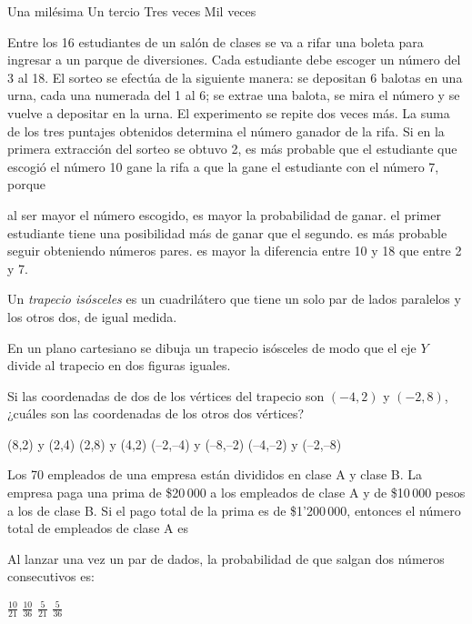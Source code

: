 \documentclass[10pt,addpoints]{exam}
\begin{document}
\begin{questions}
\begin{oneparchoices}
 \choice Una milésima
 \choice Un tercio
 \choice Tres veces
 \CorrectChoice Mil veces
\end{oneparchoices}
\question Entre los 16 estudiantes de un salón de clases se va a rifar una boleta para ingresar a un parque de diversiones. Cada estudiante debe escoger un número del 3 al 18. El sorteo se efectúa de la siguiente manera: se depositan 6 balotas en una urna, cada una numerada del 1 al 6; se extrae una balota, se mira el número y se vuelve a depositar en la urna. El experimento se repite dos veces más. La suma de los tres puntajes obtenidos determina el número ganador de la rifa. Si en la primera extracción del sorteo se obtuvo 2, es más probable que el estudiante que escogió el número 10 gane la rifa a que la gane el estudiante con el número 7, porque
\begin{choices}
 \choice al ser mayor  el número escogido, es mayor la probabilidad de ganar.
 \choice el primer estudiante tiene una posibilidad más de ganar que el segundo.
 \choice es más probable seguir obteniendo números pares.
 \CorrectChoice es mayor la diferencia entre 10 y 18 que entre 2 y 7.
\end{choices}
\question Un \emph{trapecio isósceles} es un cuadrilátero que tiene un solo par de lados paralelos y los otros dos, de igual medida.

En un plano cartesiano se dibuja un trapecio isósceles de modo que el eje $Y$ divide al trapecio en dos figuras iguales.

Si las coordenadas de dos de los vértices del trapecio son $(-4,2)$ y $(-2,8)$, ¿cuáles son las coordenadas de los otros dos vértices?
\begin{multicols}{2}
 \begin{choices}
  \choice (8,2) y (2,4)
  \CorrectChoice (2,8) y (4,2)
  \choice (--2,--4) y (--8,--2)
  \choice (--4,--2) y (--2,--8)
 \end{choices}
\end{multicols}
\question Los 70 empleados de una empresa están divididos en clase A y clase B. La empresa paga una prima de \$20\,000 a los empleados de clase A y de \$10\,000 pesos a los de clase B. Si el pago total de la prima es de \$1'200\,000, entonces el número total de empleados de clase A es

\begin{oneparchoices}
\end{oneparchoices}
\question Al lanzar una vez un par de dados, la probabilidad de que salgan dos números consecutivos es:

 \begin{oneparchoices}
  \choice $\frac{10}{21}$
  \CorrectChoice $\frac{10}{36}$
  \choice $\frac{5}{21}$
  \choice $\frac{5}{36}$
 \end{oneparchoices}

\end{questions}
\end{document}
